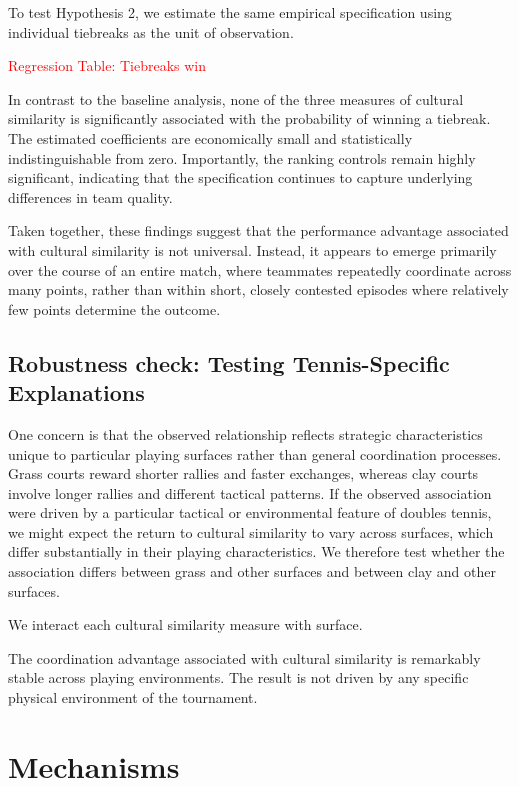 \documentclass[10pt]{article}
\begin{document}
To test Hypothesis 2, we estimate the same empirical specification using individual tiebreaks as the unit of observation.

\textcolor{red}{Regression Table: Tiebreaks win}

In contrast to the baseline analysis, none of the three measures of cultural similarity is significantly associated with the probability of winning a tiebreak. The estimated coefficients are economically small and statistically indistinguishable from zero. Importantly, the ranking controls remain highly significant, indicating that the specification continues to capture underlying differences in team quality.

Taken together, these findings suggest that the performance advantage associated with cultural similarity is not universal. Instead, it appears to emerge primarily over the course of an entire match, where teammates repeatedly coordinate across many points, rather than within short, closely contested episodes where relatively few points determine the outcome.



\subsection{Robustness check: Testing Tennis-Specific Explanations} 


One concern is that the observed relationship reflects strategic characteristics unique to particular playing surfaces rather than general coordination processes. Grass courts reward shorter rallies and faster exchanges, whereas clay courts involve longer rallies and different tactical patterns. 
If the observed association were driven by a particular tactical or environmental feature of doubles tennis, we might expect the return to cultural similarity to vary across surfaces, which differ substantially in their playing characteristics. We therefore test whether the association differs between grass and other surfaces and between clay and other surfaces.


We interact each cultural similarity measure with surface. 


The coordination advantage associated with cultural similarity is remarkably stable across playing environments. The result is not driven by any specific physical environment of the tournament.

\section{Mechanisms}
\end{document}
